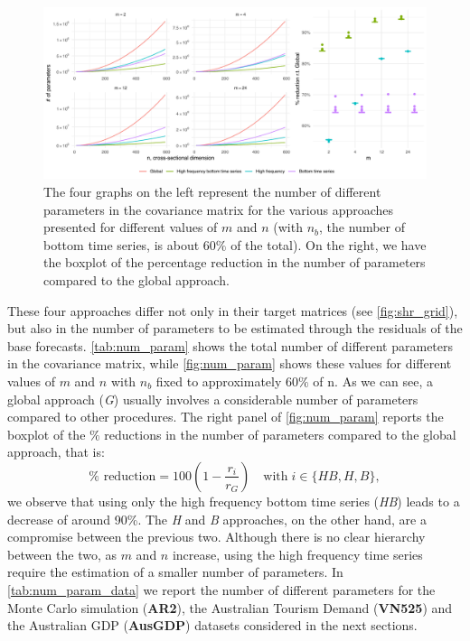 \documentclass[a4paper,11pt]{article}
\theoremstyle{definition}
\begin{document}
\begin{figure}[!tbp]
	\centering
	\includegraphics[width = \linewidth]{fig/shr_cov/parameters.pdf}
	\caption{The four graphs on the left represent the number of different parameters in the covariance matrix for the various approaches presented for different values of $m$ and $n$ (with $n_b$, the number of bottom time series, is about $60\%$ of the total). On the right, we have the boxplot of the percentage reduction in the number of parameters compared to the global approach.}
	\label{fig:num_param}
\end{figure}

These four approaches differ not only in their target matrices (see \autoref{fig:shr_grid}), but also in the number of parameters to be estimated through the residuals of the base forecasts. \autoref{tab:num_param} shows the total number of different parameters in the covariance matrix, while \autoref{fig:num_param} shows these values for different values of $m$ and $n$ with $n_b$ fixed to approximately $60\%$ of n. As we can see, a global approach (\textit{G}) usually involves a considerable number of parameters compared to other procedures. The right panel of \autoref{fig:num_param} reports the boxplot of the $\%$ reductions in the number of parameters compared to the global approach, that is:
$$
	\% \text{ reduction} = 100\left(1-\frac{r_i}{r_G}\right) \quad \mathrm{with} \; i \in \{HB, H, B\},
$$
we observe that using only the high frequency bottom time series (\textit{HB}) leads to a decrease of around 90\%. The \textit{H} and \textit{B} approaches, on the other hand, are a compromise between the previous two. Although there is no clear hierarchy between the two, as $m$ and $n$ increase, using the high frequency time series require the estimation of a smaller number of parameters. In \autoref{tab:num_param_data} we report the number of different parameters for the Monte Carlo simulation (\textbf{AR2}), the Australian Tourism Demand (\textbf{VN525}) and the Australian GDP (\textbf{AusGDP}) datasets considered in the next sections.
\end{document}
